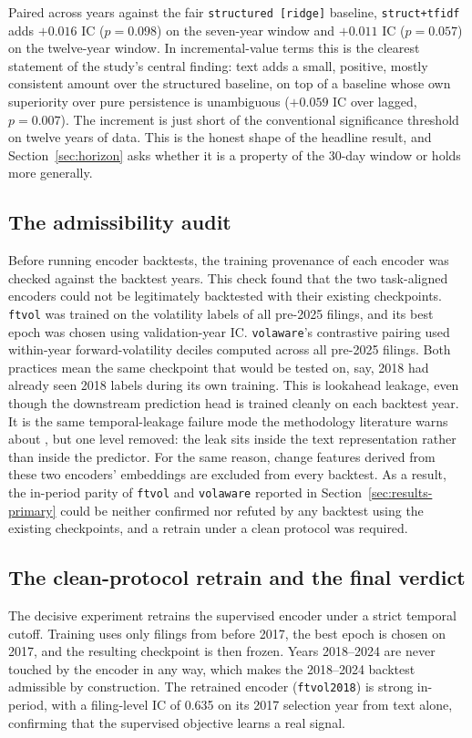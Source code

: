 \documentclass[logo,msc,ai]{infthesis}        %
\begin{document}
Paired across years against the fair \texttt{structured [ridge]} baseline, \texttt{struct+tfidf} adds $+0.016$ IC ($p=0.098$) on the seven-year window and $+0.011$ IC ($p=0.057$) on the twelve-year window. In incremental-value terms this is the clearest statement of the study's central finding: text adds a small, positive, mostly consistent amount over the structured baseline, on top of a baseline whose own superiority over pure persistence is unambiguous ($+0.059$ IC over lagged, $p=0.007$). The increment is just short of the conventional significance threshold on twelve years of data. This is the honest shape of the headline result, and Section~\ref{sec:horizon} asks whether it is a property of the 30-day window or holds more generally.

\subsection{The admissibility audit}
Before running encoder backtests, the training provenance of each encoder was checked against the backtest years. This check found that the two task-aligned encoders could not be legitimately backtested with their existing checkpoints. \texttt{ftvol} was trained on the volatility labels of all pre-2025 filings, and its best epoch was chosen using validation-year IC. \texttt{volaware}'s contrastive pairing used within-year forward-volatility deciles computed across all pre-2025 filings. Both practices mean the same checkpoint that would be tested on, say, 2018 had already seen 2018 labels during its own training. This is lookahead leakage, even though the downstream prediction head is trained cleanly on each backtest year. It is the same temporal-leakage failure mode the methodology literature warns about \cite{de2018advances}, but one level removed: the leak sits inside the text representation rather than inside the predictor. For the same reason, change features derived from these two encoders' embeddings are excluded from every backtest. As a result, the in-period parity of \texttt{ftvol} and \texttt{volaware} reported in Section~\ref{sec:results-primary} could be neither confirmed nor refuted by any backtest using the existing checkpoints, and a retrain under a clean protocol was required.

\subsection{The clean-protocol retrain and the final verdict}
The decisive experiment retrains the supervised encoder under a strict temporal cutoff. Training uses only filings from before 2017, the best epoch is chosen on 2017, and the resulting checkpoint is then frozen. Years 2018--2024 are never touched by the encoder in any way, which makes the 2018--2024 backtest admissible by construction. The retrained encoder (\texttt{ftvol2018}) is strong in-period, with a filing-level IC of 0.635 on its 2017 selection year from text alone, confirming that the supervised objective learns a real signal.
\end{document}
